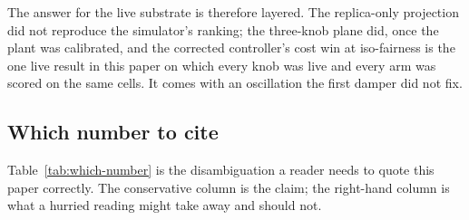 The answer for the live substrate is therefore layered. The replica-only
projection did not reproduce the simulator's ranking; the three-knob plane
did, once the plant was calibrated, and the corrected controller's cost win
at iso-fairness is the one live result in this paper on which every knob
was live and every arm was scored on the same cells. It comes with an
oscillation the first damper did not fix.

\subsection{Which number to cite}
\label{sec:eval-summary}

Table~\ref{tab:which-number} is the disambiguation a reader needs to quote
this paper correctly. The conservative column is the claim; the right-hand
column is what a hurried reading might take away and should not.

